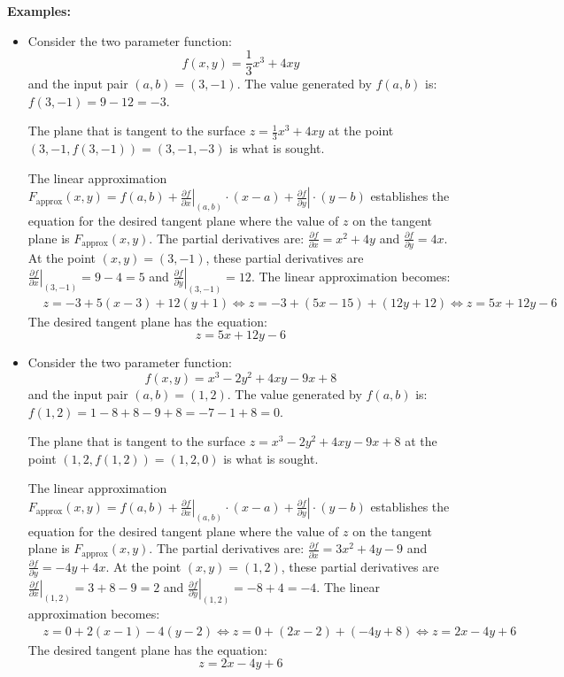 \documentclass{article}
\begin{document}
\textbf{Examples:}
\begin{itemize}
\item Consider the two parameter function:
\[f(x, y) = \frac{1}{3}x^3 + 4xy\]
and the input pair \((a, b) = (3, -1)\). The value generated by \(f(a, b)\) is: \(f(3, -1) = 9 - 12 = -3\). 

The plane that is tangent to the surface \(z = \frac{1}{3}x^3 + 4xy\) at the point \((3, -1, f(3, -1)) = (3, -1, -3)\) is what is sought. 

The linear approximation \(F_{\text{approx}}(x, y) = f(a, b) + \left.\frac{\partial f}{\partial x}\right|_{(a,b)} \cdot (x - a) + \left.\frac{\partial f}{\partial y}\right| \cdot (y - b)\) establishes the equation for the desired tangent plane where the value of \(z\) on the tangent plane is \(F_{\text{approx}}(x, y)\). The partial derivatives are: \(\frac{\partial f}{\partial x} = x^2 + 4y\) and \(\frac{\partial f}{\partial y} = 4x\). At the point \((x, y) = (3, -1)\), these partial derivatives are \(\left.\frac{\partial f}{\partial x}\right|_{(3, -1)} = 9 - 4 = 5\) and \(\left.\frac{\partial f}{\partial y}\right|_{(3, -1)} = 12\). The linear approximation becomes:
\begin{align*}
& z = -3 + 5(x - 3) + 12(y + 1) 
\iff z = -3 + (5x - 15) + (12y + 12) 
\iff z = 5x + 12y - 6 
\end{align*}     
The desired tangent plane has the equation:
\[z = 5x + 12y - 6\]
\item Consider the two parameter function:
\[f(x, y) = x^3 - 2y^2 + 4xy - 9x + 8\]
and the input pair \((a, b) = (1, 2)\). The value generated by \(f(a, b)\) is: \(f(1, 2) = 1 - 8 + 8 - 9 + 8 = -7 - 1 + 8 = 0\). 

The plane that is tangent to the surface \(z = x^3 - 2y^2 + 4xy - 9x + 8\) at the point \((1, 2, f(1, 2)) = (1, 2, 0)\) is what is sought. 

The linear approximation \(F_{\text{approx}}(x, y) = f(a, b) + \left.\frac{\partial f}{\partial x}\right|_{(a,b)} \cdot (x - a) + \left.\frac{\partial f}{\partial y}\right| \cdot (y - b)\) establishes the equation for the desired tangent plane where the value of \(z\) on the tangent plane is \(F_{\text{approx}}(x, y)\). The partial derivatives are: \(\frac{\partial f}{\partial x} = 3x^2 + 4y - 9\) and \(\frac{\partial f}{\partial y} = -4y + 4x\). At the point \((x, y) = (1, 2)\), these partial derivatives are \(\left.\frac{\partial f}{\partial x}\right|_{(1, 2)} = 3 + 8 - 9 = 2\) and \(\left.\frac{\partial f}{\partial y}\right|_{(1, 2)} = -8 + 4 = -4\). The linear approximation becomes:
\begin{align*}
& z = 0 + 2(x - 1) - 4(y - 2) 
\iff z = 0 + (2x - 2) + (-4y + 8) 
\iff z = 2x - 4y + 6 
\end{align*}     
The desired tangent plane has the equation:
\[z = 2x - 4y + 6\]
\end{itemize}
\end{document}
